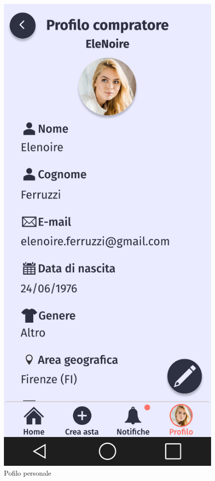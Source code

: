 \begin{figure}[!htb]
\begin{minipage}{0.32\textwidth}
            \includegraphics[width=.7\linewidth]{Immagini/Frames/Compratore/C11.pdf}
            \caption{Pofilo personale}
        \end{minipage}\hfill
    \end{figure}

    \clearpage

